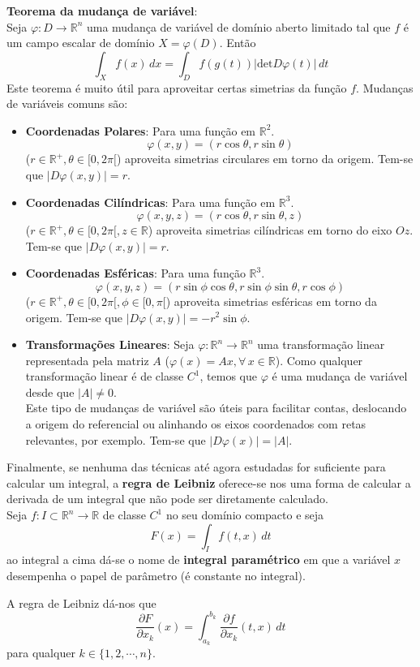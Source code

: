 \documentclass{article}
\newcommand{\R}{\mathbb{R}}
\begin{document}
\textbf{Teorema da mudança de variável}:\\
Seja $\varphi: D \to \R^n$ uma mudança de variável de domínio aberto limitado tal que $f$ é um campo escalar de domínio $X=\varphi(D)$. Então
$$
\int_X f(x) \, dx = \int_D f(g(t)) |\text{det} D \varphi(t)| \, dt
$$
Este teorema é muito útil para aproveitar certas simetrias da função $f$. Mudanças de variáveis comuns são:
\begin{itemize}
	\item \textbf{Coordenadas Polares}: Para uma função em $\R^2$.
	$$ \varphi (x,y) = (r \cos \theta, r \sin \theta) $$
	($r \in \R^+, \theta \in [0, 2\pi[$) aproveita simetrias circulares em torno da origem. Tem-se que $|D\varphi(x,y)| = r$.
	\item \textbf{Coordenadas Cilíndricas}: Para uma função em $\R^3$.
	$$ \varphi(x,y,z) = (r \cos \theta, r \sin \theta, z) $$
	($r \in \R^+, \theta \in [0,2\pi[, z \in \R$) aproveita simetrias cilíndricas em torno do eixo $Oz$. Tem-se que $|D\varphi(x,y)| = r$.
	\item \textbf{Coordenadas Esféricas}: Para uma função $\R^3$.
	$$ \varphi (x,y,z) = (r \sin \phi \cos \theta, r\sin \phi \sin \theta, r \cos \phi)	$$
	($r \in \R^+, \theta \in [0,2\pi[, \phi \in [0,\pi[$) aproveita simetrias esféricas em torno da origem. Tem-se que $|D\varphi(x,y)| = -r^2 \sin \phi$.
	\item \textbf{Transformações Lineares}: Seja $\varphi: \R^n \to \R^n$ uma transformação linear representada pela matriz $A$ ($\varphi(x) = Ax, \forall \, x \in \R$). Como qualquer transformação linear é de classe $C^1$, temos que $\varphi$ é uma mudança de variável desde que $|A| \neq 0$.\\
	Este tipo de mudanças de variável são úteis para facilitar contas, deslocando a origem do referencial ou alinhando os eixos coordenados com retas relevantes, por exemplo. Tem-se que $|D\varphi(x)|=|A|$. 
\end{itemize}
Finalmente, se nenhuma das técnicas até agora estudadas for suficiente para calcular um integral, a \textbf{regra de Leibniz} oferece-se nos uma forma de calcular a derivada de um integral que não pode ser diretamente calculado.\\
Seja $f: I \subset \R^n \to \R$ de classe $C^1$ no seu domínio compacto e seja 
$$
F(x) = \int_I f(t,x) \, dt
$$
ao integral a cima dá-se o nome de \textbf{integral paramétrico} em que a variável $x$ desempenha o papel de parâmetro (é constante no integral).

A regra de Leibniz dá-nos que
$$
\frac{\partial F}{\partial x_k} (x) = \int_{a_k}^{b_k} \frac{\partial f}{\partial x_k} (t,x) \, dt
$$
para qualquer $k \in \{ 1, 2, \cdots , n \}$.
\end{document}
